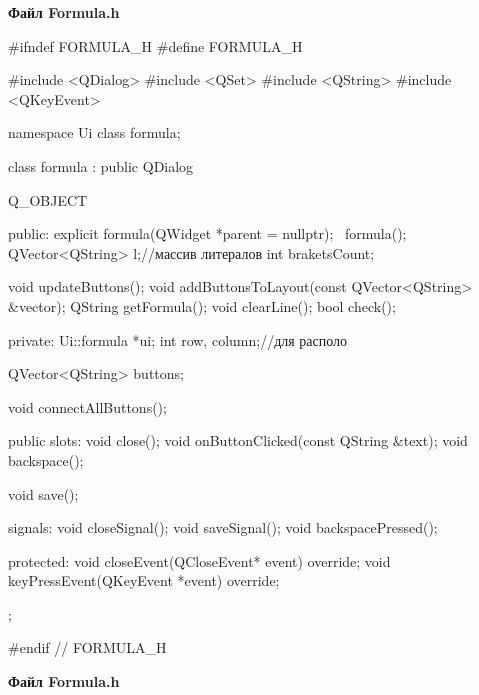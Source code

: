 \documentclass[12pt, a4paper]{article}
\begin{document}
	  \begin{center}
	  	\textbf{Файл Formula.h}
	  \end{center}
	  \begin{cppcode}[caption = Файл Formula.h]
	  	
	  	#ifndef FORMULA_H
	  	#define FORMULA_H
	  	
	  	#include <QDialog>
	  	#include <QSet>
	  	#include <QString>
	  	#include <QKeyEvent>
	  	
	  	namespace Ui {
	  		class formula;
	  	}
	  	
	  	class formula : public QDialog
	  	{
	  		Q_OBJECT
	  		
	  		public:
	  		explicit formula(QWidget *parent = nullptr);
	  		~formula();
	  		QVector<QString> l;//массив литералов
	  		int braketsCount;
	  		
	  		void updateButtons();
	  		void addButtonsToLayout(const QVector<QString> &vector);
	  		QString getFormula();
	  		void clearLine();
	  		bool check();
	  		
	  		private:
	  		Ui::formula *ui;
	  		int row, column;//для располо
	  		
	  		QVector<QString> buttons;
	  		
	  		void connectAllButtons();
	  		
	  		public slots:
	  		void close();
	  		void onButtonClicked(const QString &text);
	  		void backspace();
	  		
	  		void save();
	  		
	  		signals:
	  		void closeSignal();
	  		void saveSignal();
	  		void backspacePressed();
	  		
	  		protected:
	  		void closeEvent(QCloseEvent* event) override;
	  		void keyPressEvent(QKeyEvent *event) override;
	  		
	  	};
	  	
	  	#endif // FORMULA_H
	  	
	  \end{cppcode}
	  \begin{center}
	  	\textbf{Файл Formula.h}
	  \end{center}
\end{document}
